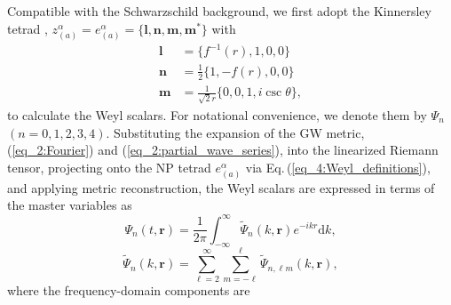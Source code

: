 \documentclass[reprint,amsmath,amssymb,aps,prd]{revtex4-2}
\newcommand{\dd}[0]{\mathrm{d}}
\begin{document}
Compatible with the Schwarzschild background, we first adopt the Kinnersley tetrad \cite{Kinnersley_1969}, $z_{(a)}^{\alpha}=e_{(a)}^{\alpha}=\{\bm{l},\bm{n},\bm{m},\bm{m}^*\}$ with
\begin{subequations}
\begin{align}
\bm{l}&=\{f^{-1}(r),1,0,0\}\\
\bm{n}&=\frac{1}{2}\{1,-f(r),0,0\}\\
\bm{m}&=\frac{1}{\sqrt{2}r}\{0,0,1,i\csc\theta\},
\end{align}
\end{subequations}
to calculate the Weyl scalars. For notational convenience, we denote them by $\Psi_n$ $(n=0,1,2,3,4)$.
Substituting the expansion of the GW metric, (\ref{eq_2:Fourier}) and (\ref{eq_2:partial_wave_series}), into the linearized Riemann tensor, projecting onto the NP tetrad $e_{(a)}^{\alpha}$ via Eq.\,(\ref{eq_4:Weyl_definitions}), and applying metric reconstruction, the Weyl scalars are expressed in terms of the master variables as
\begin{equation}
\label{eq_4:Weyl_Fourier}
\Psi_{n}(t,\bm{r})=\frac{1}{2\pi}\int_{-\infty}^{\infty}\tilde{\Psi}_n(k,\bm{r})e^{-ikr}\dd{k},
\end{equation}
\begin{equation}
\label{eq_4:Weyl_partial_wave_series}
\tilde{\Psi}_{n}(k,\bm{r})=\sum_{\ell=2}^{\infty}\sum_{m=-\ell}^{\ell}\tilde{\Psi}_{n,\ell m}(k,\bm{r}),
\end{equation}
where the frequency-domain components are 
\end{document}
